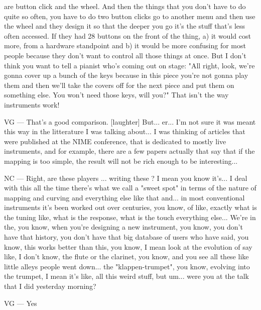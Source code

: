 are button click and the wheel. And then the things that you don't have to do quite so often, you have to do two button clicks go to another menu and then use the wheel and they design it so that the deeper you go it's the stuff that's less often accessed. If they had 28 buttons on the front of the thing, a) it would cost more, from a hardware standpoint and b) it would be more confusing for most people because they don't want to control all those things at once. But I don't think you want to tell a pianist who's coming out on stage: "All right, look, we're gonna cover up a bunch of the keys because in this piece you're not gonna play them and then we'll take the covers off for the next piece and put them on something else. You won't need those keys, will you?" That isn't the way instruments work! 

VG — That's a good comparison. [laughter] But... er... I'm not sure it was meant this way in the litterature I was talking about... I was thinking of articles that were published at the NIME conference, that is dedicated to mostly live instruments, and for example, there are a few papers actually that say that if the mapping is too simple, the result will not be rich enough to be interesting... 

NC — Right, are these players ... writing these ? I mean you know it's... I deal with this all the time there's what we call a "sweet spot" in terms of the nature of mapping and curving and everything else like that and... in most conventional instruments it's been worked out over centuries, you know, of like, exactly what is the tuning like, what is the response, what is the touch everything else... We're in the, you know, when you're designing a new instrument, you know, you don't have that history, you don't have that big database of users who have said, you know, this works better than this, you know, I mean look at the evolution of say like, I don't know, the flute or the clarinet, you know, and you see all these like little alleys people went down... the "klappen-trumpet", you know, evolving into the trumpet, I mean it's like, all this weird stuff, but um... were you at the talk that I did yesterday morning? 

VG — Yes 

